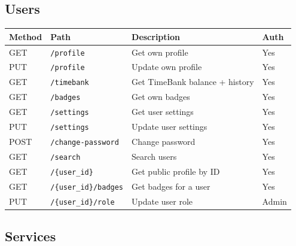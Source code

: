 \documentclass[10pt,a4paper]{report}
\begin{document}
\subsection{Users}

\begin{longtable}{|l|p{4.5cm}|p{5cm}|l|}
    \hline
    \textbf{Method} & \textbf{Path}                          & \textbf{Description}                & \textbf{Auth} \\
    \hline
    \endhead
    GET             & \texttt{/profile}                      & Get own profile                     & Yes           \\
    \hline
    PUT             & \texttt{/profile}                      & Update own profile                  & Yes           \\
    \hline
    GET             & \texttt{/timebank}                     & Get TimeBank balance + history      & Yes           \\
    \hline
    GET             & \texttt{/badges}                       & Get own badges                      & Yes           \\
    \hline
    GET             & \texttt{/settings}                     & Get user settings                   & Yes           \\
    \hline
    PUT             & \texttt{/settings}                     & Update user settings                & Yes           \\
    \hline
    POST            & \texttt{/change-password}              & Change password                     & Yes           \\
    \hline
    GET             & \texttt{/search}                       & Search users                        & Yes           \\
    \hline
    GET             & \texttt{/\{user\_id\}}                 & Get public profile by ID            & Yes           \\
    \hline
    GET             & \texttt{/\{user\_id\}/badges}          & Get badges for a user               & Yes           \\
    \hline
    PUT             & \texttt{/\{user\_id\}/role}            & Update user role                    & Admin         \\
    \hline
\end{longtable}

\subsection{Services}
\end{document}
